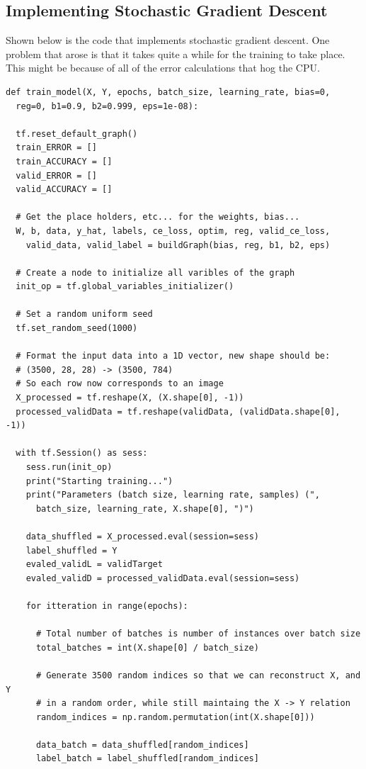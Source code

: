 \documentclass[12pt]{article}
\begin{document}
\subsection{Implementing Stochastic Gradient Descent}
Shown below is the code that implements stochastic gradient descent. One problem that arose
is that it takes quite a while for the training to take place. This might be because of all of the
error calculations that hog the CPU.

\begin{verbatim}
def train_model(X, Y, epochs, batch_size, learning_rate, bias=0, 
  reg=0, b1=0.9, b2=0.999, eps=1e-08):

  tf.reset_default_graph()
  train_ERROR = []
  train_ACCURACY = []
  valid_ERROR = []
  valid_ACCURACY = []

  # Get the place holders, etc... for the weights, bias...
  W, b, data, y_hat, labels, ce_loss, optim, reg, valid_ce_loss, 
    valid_data, valid_label = buildGraph(bias, reg, b1, b2, eps)
  
  # Create a node to initialize all varibles of the graph
  init_op = tf.global_variables_initializer()

  # Set a random uniform seed 
  tf.set_random_seed(1000)

  # Format the input data into a 1D vector, new shape should be:
  # (3500, 28, 28) -> (3500, 784)
  # So each row now corresponds to an image
  X_processed = tf.reshape(X, (X.shape[0], -1))
  processed_validData = tf.reshape(validData, (validData.shape[0], -1))

  with tf.Session() as sess:
    sess.run(init_op)
    print("Starting training...")
    print("Parameters (batch size, learning rate, samples) (", 
      batch_size, learning_rate, X.shape[0], ")")

    data_shuffled = X_processed.eval(session=sess)
    label_shuffled = Y
    evaled_validL = validTarget
    evaled_validD = processed_validData.eval(session=sess)

    for itteration in range(epochs):

      # Total number of batches is number of instances over batch size
      total_batches = int(X.shape[0] / batch_size)

      # Generate 3500 random indices so that we can reconstruct X, and Y
      # in a random order, while still maintaing the X -> Y relation 
      random_indices = np.random.permutation(int(X.shape[0]))

      data_batch = data_shuffled[random_indices]
      label_batch = label_shuffled[random_indices]


\end{verbatim}
\end{document}
